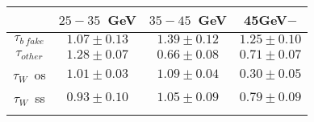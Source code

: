 \centering
\begin{tabular}{cccc} \toprule\toprule
 & $25-35$~GeV & $35-45$~GeV & 45GeV$-$\\\midrule
$\tau_{b~fake}$ & $1.07\pm0.13$ & $1.39\pm0.12$ & $1.25\pm0.10$\\
$\tau_{other}$ & $1.28\pm0.07$ & $0.66\pm0.08$ & $0.71\pm0.07$\\
$\tau_{W}$~os & $1.01\pm0.03$ & $1.09\pm0.04$ & $0.30\pm0.05$\\
$\tau_{W}$~ss & $0.93\pm0.10$ & $1.05\pm0.09$ & $0.79\pm0.09$\\
\bottomrule\bottomrule\\
\end{tabular}
